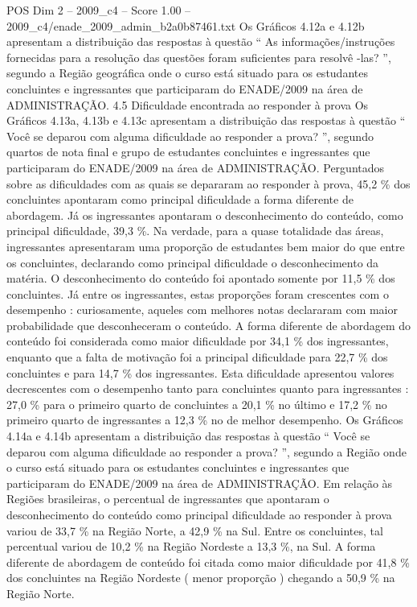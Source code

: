 \begin{textsample}{POS Dim 2 – 2009\_c4 – Score 1.00 – 2009\_c4/enade\_2009\_admin\_b2a0b87461.txt}
Os Gráficos 4.12a e 4.12b apresentam a distribuição das respostas à questão “ As informações/instruções fornecidas para a resolução das questões foram suficientes para resolvê -las? ”, segundo a Região geográfica onde o curso está situado para os estudantes concluintes e ingressantes que participaram do ENADE/2009 na área de ADMINISTRAÇÃO. 4.5 Dificuldade encontrada ao responder à prova Os Gráficos 4.13a, 4.13b e 4.13c apresentam a distribuição das respostas à questão “ Você se deparou com alguma dificuldade ao responder a prova? ”, segundo quartos de nota final e grupo de estudantes concluintes e ingressantes que participaram do ENADE/2009 na área de ADMINISTRAÇÃO.
Perguntados sobre as dificuldades com as quais se depararam ao responder à prova, 45,2 \% dos concluintes apontaram como principal dificuldade a forma diferente de abordagem.
Já os ingressantes apontaram o desconhecimento do conteúdo, como principal dificuldade, 39,3 \%.
Na verdade, para a quase totalidade das áreas, ingressantes apresentaram uma proporção de estudantes bem maior do que entre os concluintes, declarando como principal dificuldade o desconhecimento da matéria.
O desconhecimento do conteúdo foi apontado somente por 11,5 \% dos concluintes.
Já entre os ingressantes, estas proporções foram crescentes com o desempenho : curiosamente, aqueles com melhores notas declararam com maior probabilidade que desconheceram o conteúdo.
A forma diferente de abordagem do conteúdo foi considerada como maior dificuldade por 34,1 \% dos ingressantes, enquanto que a falta de motivação foi a principal dificuldade para 22,7 \% dos concluintes e para 14,7 \% dos ingressantes.
Esta dificuldade apresentou valores decrescentes com o desempenho tanto para concluintes quanto para ingressantes : 27,0 \% para o primeiro quarto de concluintes a 20,1 \% no último e 17,2 \% no primeiro quarto de ingressantes a 12,3 \% no de melhor desempenho.
Os Gráficos 4.14a e 4.14b apresentam a distribuição das respostas à questão “ Você se deparou com alguma dificuldade ao responder a prova? ”, segundo a Região onde o curso está situado para os estudantes concluintes e ingressantes que participaram do ENADE/2009 na área de ADMINISTRAÇÃO.
Em relação às Regiões brasileiras, o percentual de ingressantes que apontaram o desconhecimento do conteúdo como principal dificuldade ao responder à prova variou de 33,7 \% na Região Norte, a 42,9 \% na Sul.
Entre os concluintes, tal percentual variou de 10,2 \% na Região Nordeste a 13,3 \%, na Sul.
A forma diferente de abordagem de conteúdo foi citada como maior dificuldade por 41,8 \% dos concluintes na Região Nordeste ( menor proporção ) chegando a 50,9 \% na Região Norte.

\end{textsample}
